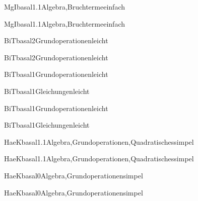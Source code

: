 \documentclass[12pt]{article}
\begin{document}
    \begin{Add}{MgI}{basal1.1}{Algebra,Bruchterme}{einfach}
    \solution{ }
    \end{Add}
    \begin{Add}{MgI}{basal1.1}{Algebra,Bruchterme}{einfach}
    \end{Add}
    

\begin{Add}{BiT}{basal2}{Grundoperationen}{leicht}
\solution{ }
\end{Add}
\begin{Add}{BiT}{basal2}{Grundoperationen}{leicht}
\end{Add}

            \begin{Add}{BiT}{basal1}{Grundoperationen}{leicht}

\end{Add}

\begin{Add}{BiT}{basal1}{Gleichungen}{leicht}
            \solution{ }
            \end{Add}
            \begin{Add}{BiT}{basal1}{Grundoperationen}{leicht}

\end{Add}

\begin{Add}{BiT}{basal1}{Gleichungen}{leicht}
            \end{Add}
            

\begin{Add}{HaeK}{basal1.1}{Algebra,Grundoperationen,Quadratisches}{simpel}
\solution{ }
\end{Add}
\begin{Add}{HaeK}{basal1.1}{Algebra,Grundoperationen,Quadratisches}{simpel}
\end{Add}

\begin{Add}{HaeK}{basal0}{Algebra,Grundoperationen}{simpel}
\solution{ }
\end{Add}
\begin{Add}{HaeK}{basal0}{Algebra,Grundoperationen}{simpel}
\end{Add}
\end{document}
